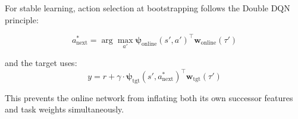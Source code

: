 \documentclass[11pt]{article}
\begin{document}
For stable learning, action selection at bootstrapping follows the Double DQN principle:

\begin{equation}
a^*_{\text{next}} = \arg\max_{a'} \bm{\psi}_{\text{online}}(s', a')^\top \mathbf{w}_{\text{online}}(\tau')
\end{equation}

and the target uses:
\begin{equation}
y = r + \gamma \cdot \bm{\psi}_{\text{tgt}}(s', a^*_{\text{next}})^\top \mathbf{w}_{\text{tgt}}(\tau')
\end{equation}

This prevents the online network from inflating both its own successor features and task weights simultaneously.
\end{document}
